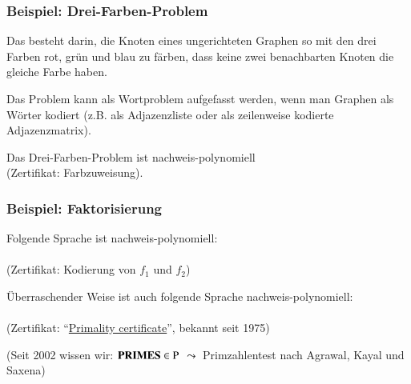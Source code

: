 \documentclass[aspectratio=1610,onlymath]{beamer}
\begin{document}
\begin{frame}\frametitle{Beispiel: Drei-Farben-Problem}

Das  besteht darin, die Knoten eines ungerichteten Graphen so mit den
drei Farben rot, grün und blau zu färben, dass keine zwei benachbarten Knoten die gleiche Farbe haben.
\medskip

\pause

\medskip
Das Problem kann als Wortproblem aufgefasst werden, wenn man Graphen als Wörter kodiert (z.B. als Adjazenzliste oder als zeilenweise kodierte Adjazenzmatrix).
\medskip

\alert{Das Drei-Farben-Problem ist nachweis-polynomiell}\\ (Zertifikat: Farbzuweisung).

\end{frame}

\begin{frame}\frametitle{Beispiel: Faktorisierung}

\medskip

Folgende Sprache ist nachweis-polynomiell:\\[1ex]
\\[1ex]
(Zertifikat: Kodierung von $f_1$ und $f_2$)
\bigskip\pause

Überraschender Weise ist auch folgende Sprache nachweis-polynomiell:\\[1ex]
\\[1ex]
(Zertifikat: "`\href{https://en.wikipedia.org/wiki/Primality_certificate}{Primality certificate}"', bekannt seit 1975)
\bigskip\pause

\textcolor{devilscss}{(Seit 2002 wissen wir: $\textbf{PRIMES}\in{\textsc{P}}$}
\textcolor{devilscss}{$\leadsto$ Primzahlentest nach Agrawal, Kayal und Saxena)}

\end{frame}
\end{document}
